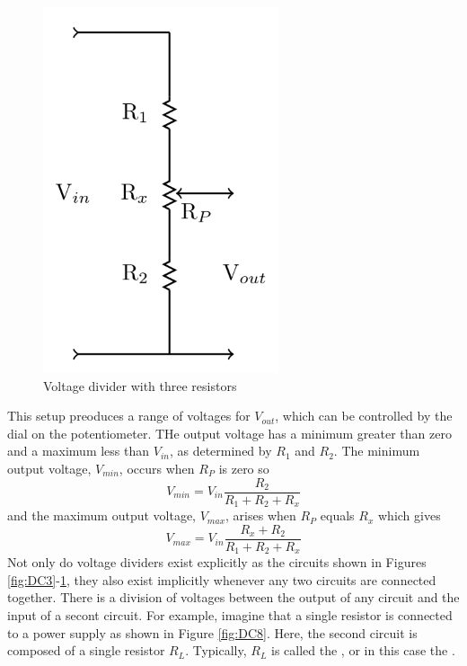 \documentclass[12pt, a4paper, oneside, openright, titlepage]{book}
\begin{document}
\begin{figure}[H]
    \centering
    \includegraphics[scale = 0.8]{Images/DC7.PNG}
    \caption{Voltage divider with three resistors}
    \label{fig:DC7}
\end{figure}


This setup preoduces a range of voltages for $V_{out}$, which can be controlled by the dial on the potentiometer. THe output voltage has a minimum greater than zero and a maximum less than $V_{in}$, as determined by $R_1$ and $R_2$. The minimum output voltage, $V_{min}$, occurs when $R_P$ is zero so \begin{equation}\label{eq:DC7}
    V_{min} = V_{in}\frac{R_2}{R_1+R_2+R_x}
\end{equation}
and the maximum output voltage, $V_{max}$, arises when $R_P$ equals $R_x$ which gives \begin{equation}\label{eq:DC8}
    V_{max} = V_{in}\frac{R_x+R_2}{R_1+R_2+R_x}
\end{equation}
Not only do voltage dividers exist explicitly as the circuits shown in Figures \ref{fig:DC3}-\ref{fig:DC7}, they also exist implicitly whenever any two circuits are connected together. There is a division of voltages between the output of any circuit and the input of a secont circuit. For example, imagine that a single resistor is connected to a power supply as shown in Figure \ref{fig:DC8}. Here, the second circuit is composed of a single resistor $R_L$. Typically, $R_L$ is called the , or in this case the .
\end{document}
